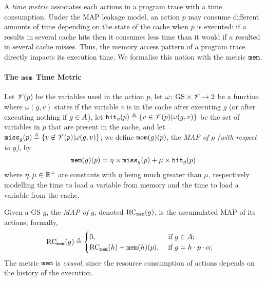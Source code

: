 A \emph{time metric} associates each actions in a program trace with a time consumption. Under the MAP leakage model, an action $p$ may consume different amounts of time depending on the state of the cache when $p$ is executed: if $a$ results in several cache hits then it consumes less time than it would if $a$ resulted in several cache misses. Thus, the memory access pattern of a program trace directly impacts its execution time. We formalise this notion with the{ metric} $\texttt{mem}$.


\paragraph*{The $\texttt{mem}$ Time Metric}
Let $\mathscr{V}(p)$ be the variables used in the action $p$, let $\omega\colon \text{GS}\times \mathscr{V}\rightarrow 2$ be a function where $\omega(g,v)$ states if the variable $v$ is in the cache after executing $g$ (or after executing nothing if $g\in A$), let $\texttt{hit}_g(p)\triangleq\left\{v\in \mathscr{V}(p)| \omega(g,v)\right\}$ be the set of variables in $p$ that are present in the cache, and let $\texttt{miss}_g(p)\triangleq\left\{v\not\in \mathscr{V}(p)| \omega(g,v)\right\}$; we define $\texttt{mem}(g)(p)$, the \emph{MAP of $p$ (with respect to $g$)}, %
by
\begin{align*}
\cache(g)(p)=%
        \eta\times\texttt{miss}_g(p)+\mu\times\texttt{hit}_g(p) 
\end{align*}
where $\eta,\mu\in \mathbb{R}^+$ are constants with $\eta$ being much greater than $\mu$, respectively modelling the time to load a variable from memory and the time to load a variable from the cache.

Given a GS $g$, the \emph{MAP of $g$}, denoted $\text{RC}_{\texttt{mem}}(g)$, is the accumulated MAP of its actions; formally,
\begin{align*}
\text{RC}_{\texttt{mem}}(g)&\triangleq 
\begin{cases}
0, &\ \text{if $g \in A$;}\\
\text{RC}_{\texttt{mem}}(h)+\texttt{mem}(h)(p),&\ \text{if $g=h \cdot p\cdot \alpha $;}\\
\end{cases}
\end{align*}
The metric $\texttt{mem}$ is \emph{causal}, since the resource consumption of actions depends on the history of the execution. 

